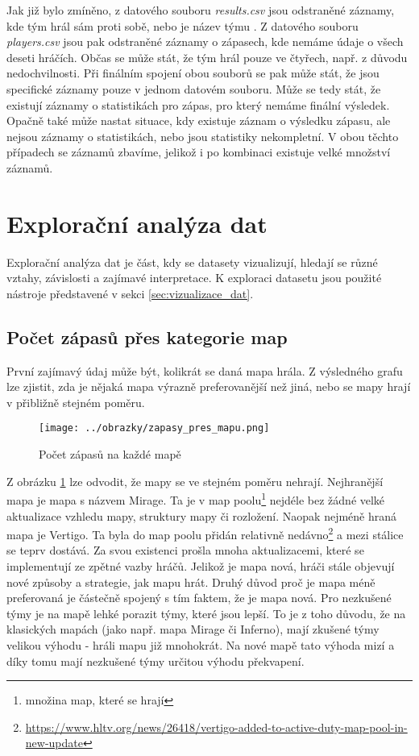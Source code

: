 Jak již bylo zmíněno, z datového souboru \textit{results.csv} jsou odstraněné záznamy, kde tým hrál sám proti sobě, nebo je název týmu . Z datového souboru  
\textit{players.csv} jsou pak odstraněné záznamy o zápasech, kde nemáme údaje o všech deseti hráčích. Občas se může stát, že tým hrál pouze ve čtyřech, např. z důvodu
nedochvilnosti. Při finálním spojení obou souborů se pak může stát, že jsou specifické záznamy pouze v jednom datovém souboru. Může se tedy stát, že existují
záznamy o statistikách pro zápas, pro který nemáme finální výsledek. Opačně také může nastat situace, kdy existuje záznam o výsledku zápasu, ale nejsou záznamy o statistikách,
nebo jsou statistiky nekompletní. V obou těchto případech se záznamů zbavíme, jelikož i po kombinaci existuje velké množství záznamů.

\newpage
\section{Explorační analýza dat}
Explorační analýza dat je část, kdy se datasety vizualizují, hledají se různé vztahy, závislosti a zajímavé interpretace. K exploraci datasetu
jsou použité nástroje představené v sekci \ref{sec:vizualizace_dat}. 

\subsection{Počet zápasů přes kategorie map}
První zajímavý údaj může být, kolikrát se daná mapa hrála. Z výsledného grafu lze zjistit, zda je nějaká mapa výrazně preferovanější než jiná, nebo se mapy
hrají v přibližně stejném poměru.

\begin{figure}[H]
    \centering
    \texttt{[image: ../obrazky/zapasy\_pres\_mapu.png]}
    \caption{Počet zápasů na každé mapě} 
    \label{fig:zapasy_pres_mapu}
\end{figure}

Z obrázku \ref{fig:zapasy_pres_mapu} lze odvodit, že mapy se ve stejném poměru nehrají. Nejhranější mapa je mapa s názvem Mirage. Ta je v map
poolu\footnote{množina map, které se hrají} nejdéle bez žádné velké aktualizace vzhledu mapy, struktury mapy či rozložení. Naopak nejméně hraná mapa
je Vertigo. Ta byla do map poolu přidán relativně nedávno\footnote{\url{https://www.hltv.org/news/26418/vertigo-added-to-active-duty-map-pool-in-new-update}} a 
mezi stálice se teprv dostává. Za svou existenci prošla mnoha aktualizacemi, které se implementují ze zpětné vazby hráčů. Jelikož je mapa nová, hráči stále objevují 
nové způsoby a strategie, jak mapu hrát. Druhý důvod proč je mapa méně preferovaná je částečně spojený s tím faktem, že je mapa nová. Pro nezkušené týmy je na mapě
lehké porazit týmy, které jsou lepší. To je z toho důvodu, že na klasických mapách (jako např. mapa Mirage či Inferno), mají zkušené týmy velikou výhodu - hráli mapu již
mnohokrát. Na nové mapě tato výhoda mizí a díky tomu mají nezkušené týmy určitou výhodu překvapení.

